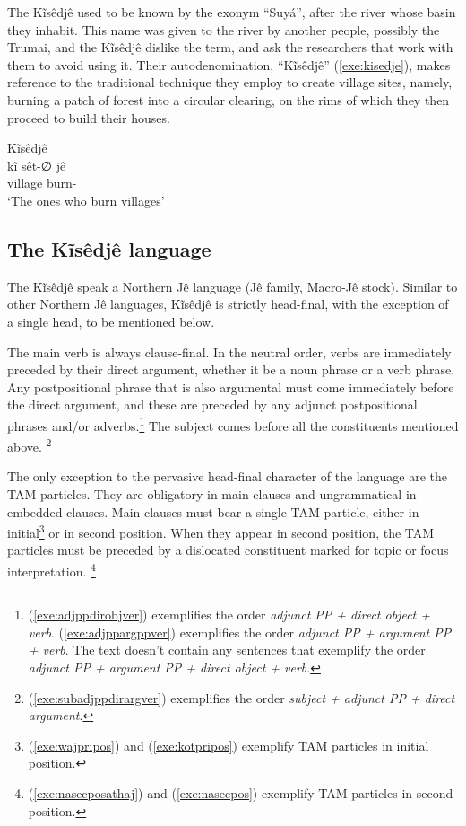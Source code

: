 \documentclass[output=paper,
modfonts,nonflat
]{langsci/langscibook}
\begin{document}
The Kĩsêdjê used to be known by the exonym ``Suyá'', after the river whose
basin they inhabit. This name was given to the river by another people,
possibly the Trumai, and the Kĩsêdjê dislike the term, and ask the researchers
that work with them to avoid using it. Their autodenomination, ``Kĩsêdjê''
(\ref{exe:kisedje}), makes reference to the traditional technique they employ
to create village sites, namely, burning a patch of forest into a circular
clearing, on the rims of which they then proceed to build their houses.

  
\ea Kĩsêdjê \\[.3em]
\gll kĩ      sêt-∅        jê    \\
     village burn-\Nmlz{} \Pl{} \\
\glt ‘The ones who burn villages’ \\
\label{exe:kisedje}
\z


\newpage 
\subsection{The Kĩsêdjê language} %

The Kĩsêdjê speak a Northern Jê language (Jê family, Macro-Jê stock). Similar
to other Northern Jê languages, Kĩsêdjê is strictly head-final, with the
exception of a single head, to be mentioned below.

The main verb is always clause-final. In the neutral order, verbs are
immediately preceded by their direct argument, whether it be a noun phrase or a
verb phrase. Any postpositional phrase that is also argumental must come
immediately before the direct argument, and these are preceded by any adjunct
postpositional phrases and/or adverbs.\footnote{(\ref{exe:adjppdirobjver})
exemplifies the order \textit{adjunct PP + direct object + verb}.
(\ref{exe:adjppargppver}) exemplifies the order \textit{adjunct PP + argument
PP + verb}. The text doesn't contain any sentences that exemplify the order
\textit{adjunct PP + argument PP + direct object + verb}.} The subject comes
before all the constituents mentioned above.%
\footnote{(\ref{exe:subadjppdirargver}) exemplifies the order
\textit{subject + adjunct PP + direct argument}.} 

The only exception to the pervasive head-final character of the language are
the TAM particles. They are obligatory in main clauses and ungrammatical in
embedded clauses. Main clauses must bear a single TAM particle, either in
initial\footnote{(\ref{exe:wajpripos}) and (\ref{exe:kotpripos}) exemplify 
TAM particles in initial position.} or in second position. When they appear in
second position, the TAM particles must be preceded by a dislocated
constituent marked for topic or focus interpretation.%
\footnote{(\ref{exe:nasecposathaj}) and (\ref{exe:nasecpos}) exemplify 
TAM particles in second position.} 
\end{document}
